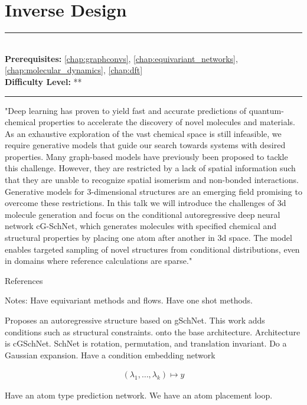 \documentclass[book.tex]{subfiles}
\begin{document}
\chapter{Inverse Design}

\label{chap:selfies}
\noindent\rule{11cm}{0.4pt} \\
\textbf{Prerequisites:} \autoref{chap:graphconvs}, \autoref{chap:equivariant_networks}, \autoref{chap:molecular_dynamics},  \autoref{chap:dft} \\
\textbf{Difficulty Level:} ** \\
\noindent\rule{11cm}{0.4pt}
\vspace{5mm}

"Deep learning has proven to yield fast and accurate predictions of quantum-chemical properties to accelerate the discovery of novel molecules and materials. As an exhaustive exploration of the vast chemical space is still infeasible, we require generative models that guide our search towards systems with desired properties. Many graph-based models have previously been proposed to tackle this challenge. However, they are restricted by a lack of spatial information such that they are unable to recognize spatial isomerism and non-bonded interactions. Generative models for 3-dimensional structures are an emerging field promising to overcome these restrictions. In this talk we will introduce the challenges of 3d molecule generation and focus on the conditional autoregressive deep neural network cG-SchNet, which generates molecules with specified chemical and structural properties by placing one atom after another in 3d space. The model enables targeted sampling of novel structures from conditional distributions, even in domains where reference calculations are sparse."

References \cite{gebauer2022inverse}


Notes: Have equivariant methods and flows. Have one shot methods.

Proposes an autoregressive structure based on gSchNet. This work adds conditions such as structural constraints. onto the base architecture. Architecture is cGSchNet. SchNet is rotation, permutation, and translation invariant. Do a Gaussian expansion. Have a condition embedding network

\begin{align}
(\lambda_1,\dotsc,\lambda_k) \mapsto y
\end{align}

Have an atom type prediction network. We have an atom placement loop.
\end{document}
